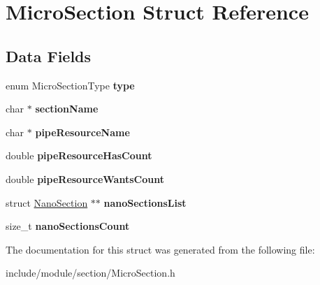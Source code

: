 \hypertarget{struct_micro_section}{}\section{Micro\+Section Struct Reference}
\label{struct_micro_section}
\subsection*{Data Fields}
\begin{DoxyCompactItemize}
\item 
\hypertarget{struct_micro_section_a523f9c053238202870aa7fcd00c890da}{}\label{struct_micro_section_a523f9c053238202870aa7fcd00c890da} 
enum Micro\+Section\+Type {\bfseries type}
\item 
\hypertarget{struct_micro_section_a7dadb8f2b7c0ffb34931b35b5af02e99}{}\label{struct_micro_section_a7dadb8f2b7c0ffb34931b35b5af02e99} 
char $\ast$ {\bfseries section\+Name}
\item 
\hypertarget{struct_micro_section_afa0c147f49333d1226a02e55d9bc6f94}{}\label{struct_micro_section_afa0c147f49333d1226a02e55d9bc6f94} 
char $\ast$ {\bfseries pipe\+Resource\+Name}
\item 
\hypertarget{struct_micro_section_a9e7d714df3ba5642dbc719419fd16192}{}\label{struct_micro_section_a9e7d714df3ba5642dbc719419fd16192} 
double {\bfseries pipe\+Resource\+Has\+Count}
\item 
\hypertarget{struct_micro_section_a18edf5cca337ced295e9bf6bdc904cda}{}\label{struct_micro_section_a18edf5cca337ced295e9bf6bdc904cda} 
double {\bfseries pipe\+Resource\+Wants\+Count}
\item 
\hypertarget{struct_micro_section_aec63f87f8d4f3afbfdb13d8f6ad16a9b}{}\label{struct_micro_section_aec63f87f8d4f3afbfdb13d8f6ad16a9b} 
struct \hyperlink{struct_nano_section}{Nano\+Section} $\ast$$\ast$ {\bfseries nano\+Sections\+List}
\item 
\hypertarget{struct_micro_section_a380eb53156231f54370b67b8327f0eff}{}\label{struct_micro_section_a380eb53156231f54370b67b8327f0eff} 
size\+\_\+t {\bfseries nano\+Sections\+Count}
\end{DoxyCompactItemize}


The documentation for this struct was generated from the following file\+:\begin{DoxyCompactItemize}
\item 
include/module/section/Micro\+Section.\+h\end{DoxyCompactItemize}
